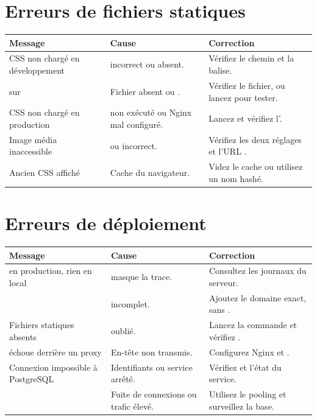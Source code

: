 \section{Erreurs de fichiers statiques}

\begin{longtable}{L{5.2cm} L{4.5cm} L{4.7cm}}
\toprule
\textbf{Message} & \textbf{Cause} & \textbf{Correction} \\
\midrule
\endhead
\footnotesize
CSS non chargé en développement &  incorrect ou
 absent. & Vérifiez le chemin et la balise. \\
 sur  & Fichier absent ou . &
Vérifiez le fichier, ou lancez  pour tester. \\
CSS non chargé en production &  non exécuté ou Nginx mal
configuré. & Lancez  et vérifiez l'. \\
Image média inaccessible &  ou  incorrect. &
Vérifiez les deux réglages et l'URL . \\
Ancien CSS affiché & Cache du navigateur. & Videz le cache ou utilisez un nom
hashé. \\
\bottomrule
\end{longtable}

\section{Erreurs de déploiement}

\begin{longtable}{L{5.2cm} L{4.5cm} L{4.7cm}}
\toprule
\textbf{Message} & \textbf{Cause} & \textbf{Correction} \\
\midrule
\endhead
\footnotesize
{} en production, rien en local &  masque la trace. &
Consultez les journaux du serveur. \\
 &  incomplet. & Ajoutez le domaine
exact, sans . \\
Fichiers statiques absents &  oublié. & Lancez la commande et
vérifiez . \\
 échoue derrière un proxy & En-tête  non
transmis. & Configurez Nginx et . \\
Connexion impossible à PostgreSQL & Identifiants ou service arrêté. & Vérifiez
 et l'état du service. \\
 & Fuite de connexions ou trafic élevé. & Utilisez le
pooling et surveillez la base. \\
\bottomrule
\end{longtable}

